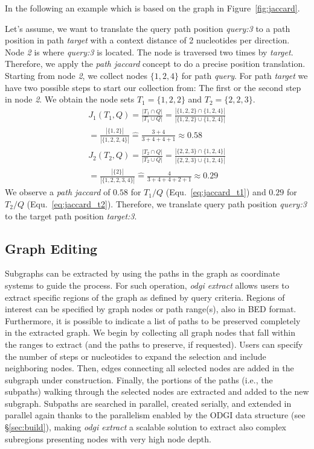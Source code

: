 \documentclass{bioinfo}
\begin{document}
In the following an example which is based on the graph in Figure~\ref{fig:jaccard}.

Let's assume, we want to translate the query path position \textit{query:3} to a path position in path \textit{target} with a context distance of 2 nucleotides per direction. Node \textit{2} is where \textit{query:3} is located. The node is traversed two times by \textit{target}. Therefore, we apply the \textit{path jaccard} concept to do a precise position translation. Starting from node \textit{2}, we collect nodes $\{1,2,4\}$ for path \textit{query}. For path \textit{target} we have two possible steps to start our collection from: The first or the second step in node \textit{2}. We obtain the node sets $T_1=\{1,2,2\}$ and $T_2=\{2,2,3\}$.
\begin{multline}
	J_1(T_1,Q)=\frac{|T_1\cap Q|}{|T_1\cup Q|}=\frac{|\{1,2,2\}\cap \{1,2,4\}|}{|\{1,2,2\}\cup \{1,2,4\}|}\\=\frac{|\{1,2\}|}{|\{1,2,2,4\}|}\widehat{=}\frac{3+4}{3+4+4+1}\approx0.58
	\label{eq:jaccard_t1}
\end{multline}
\begin{multline}
	J_2(T_2,Q)=\frac{|T_2\cap Q|}{|T_2\cup Q|}=\frac{|\{2,2,3\}\cap \{1,2,4\}|}{|\{2,2,3\}\cup \{1,2,4\}|}\\=\frac{|\{2\}|}{|\{1,2,2,3,4\}|}\widehat{=}\frac{4}{3+4+4+2+1}\approx0.29
	\label{eq:jaccard_t2}
\end{multline}
We observe a \textit{path jaccard} of $0.58$ for $T_1/Q$ (Equ.~\ref{eq:jaccard_t1}) and $0.29$ for $T_2/Q$ (Equ.~\ref{eq:jaccard_t2}).
Therefore, we translate query path position \textit{query:3} to the target path position \textit{target:3}.

\subsection{Graph Editing}
\label{sec:supp_edit}
Subgraphs can be extracted by using the paths in the graph as coordinate systems to guide the process. For such operation, \textit{odgi extract} allows users to extract specific regions of the graph as defined by query criteria.
Regions of interest can be specified by graph nodes or path range(s), also in BED format. Furthermore, it is possible to indicate a list of paths to be preserved completely in the extracted graph.
We begin by collecting all graph nodes that fall within the ranges to extract (and the paths to preserve, if requested).
Users can specify the number of steps or nucleotides to expand the selection and include neighboring nodes.
Then, edges connecting all selected nodes are added in the subgraph under construction.
Finally, the portions of the paths (i.e., the subpaths) walking through the selected nodes are extracted and added to the new subgraph.
Subpaths are searched in parallel, created serially, and extended in parallel again thanks to the parallelism enabled by the ODGI data structure (see \S\ref{sec:build}), making \textit{odgi extract} a scalable solution to extract also complex subregions presenting nodes with very high node depth.
\end{document}

